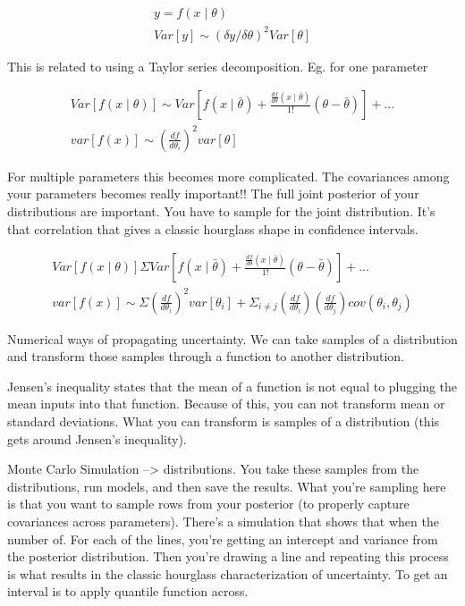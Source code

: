 \documentclass[12pt, oneside]{article}   	%
\begin{document}
\begin{align} y = f(x \mid \theta) \\
Var[y] \sim (\delta y / \delta \theta)^2 Var[ \theta ]
\end{align}

This is related to using a Taylor series decomposition. Eg. for one parameter

\begin{align}
Var[ f(x \mid \theta)] \sim Var[ f(x \mid \bar{\theta}) + \frac{ \frac{df}{d\theta} ( x \mid \bar{\theta} )}{1!} ( \theta - \bar{\theta})] + ... \\
var[f(x)] \sim  (\frac{df}{d\theta_i} )^2 var[\theta]
\end{align}

For multiple parameters this becomes more complicated. The covariances among your parameters becomes really important!! The full joint posterior of your distributions are important. You have to sample for the joint distribution. It's that correlation that gives a classic hourglass shape in confidence intervals.

\begin{align}
Var[ f(x \mid \theta)] \Sigma Var[ f(x \mid \bar{\theta}) + \frac{ \frac{df}{d\theta} ( x \mid \bar{\theta} )}{1!} ( \theta - \bar{\theta})] + ... \\
var[f(x)] \sim \Sigma (\frac{df}{d\theta_i} )^2 var[\theta_i] + \Sigma_{i\neq j} ( \frac{df}{d\theta_i} )(\frac{df}{d\theta_j} ) cov(\theta_i, \theta_j)
\end{align}

Numerical ways of propagating uncertainty. We can take samples of a distribution and transform those samples through a function to another distribution. 

Jensen's inequality states that the mean of a function is not equal to plugging the mean inputs into that function. Because of this, you can not transform mean or standard deviations. What you can transform is samples of a distribution (this gets around Jensen's inequality).

Monte Carlo Simulation --> distributions. You take these samples from the distributions, run models, and then save the results. What you're sampling here is that you want to sample rows from your posterior (to properly capture covariances across parameters). There's a simulation that shows that when the number of. For each of the lines, you're getting an intercept and variance from the posterior distribution. Then you're drawing a line and repeating this process is what results in the classic hourglass characterization of uncertainty. To get an interval is to apply quantile function across. 
\end{document}

